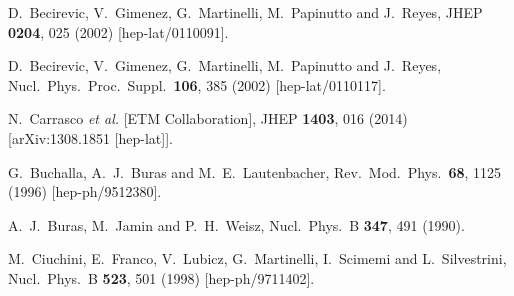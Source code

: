 \documentclass[prd,preprint,superscriptaddress,amsmath,amssymb]{revtex4}
\begin{document}
\begin{thebibliography}{100}
  D.~Becirevic, V.~Gimenez, G.~Martinelli, M.~Papinutto and J.~Reyes,
  JHEP {\bf 0204}, 025 (2002)
  [hep-lat/0110091].


  D.~Becirevic, V.~Gimenez, G.~Martinelli, M.~Papinutto and J.~Reyes,
  Nucl.\ Phys.\ Proc.\ Suppl.\  {\bf 106}, 385 (2002)
  [hep-lat/0110117].
  
  N.~Carrasco {\it et al.} [ETM Collaboration],
  JHEP {\bf 1403}, 016 (2014)
  [arXiv:1308.1851 [hep-lat]].
  
  
  G.~Buchalla, A.~J.~Buras and M.~E.~Lautenbacher,
  Rev.\ Mod.\ Phys.\  {\bf 68}, 1125 (1996)
  [hep-ph/9512380].


  A.~J.~Buras, M.~Jamin and P.~H.~Weisz,
  Nucl.\ Phys.\ B {\bf 347}, 491 (1990).
  
  M.~Ciuchini, E.~Franco, V.~Lubicz, G.~Martinelli, I.~Scimemi and L.~Silvestrini,
  Nucl.\ Phys.\ B {\bf 523}, 501 (1998)
  [hep-ph/9711402].


\end{thebibliography}
\end{document}
